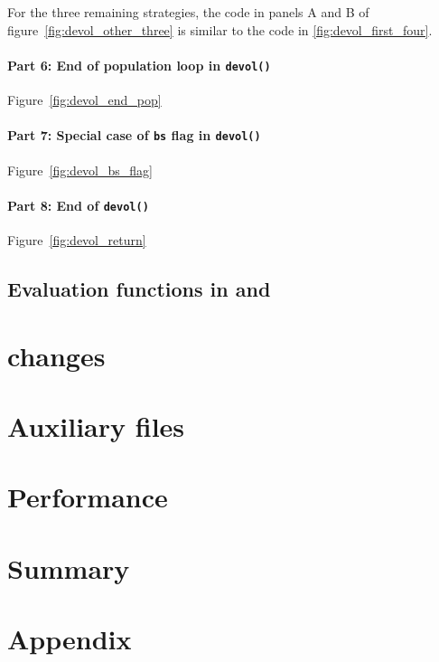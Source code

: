 \documentclass[nojss,shortnames,article]{jss}
\begin{document}
For the three remaining strategies, the code in panels A and B of
figure~\ref{fig:devol_other_three} is similar to the code in
\ref{fig:devol_first_four}.

\paragraph{Part 6: End of population loop in  \texttt{devol()}} 

Figure~\ref{fig:devol_end_pop}

\paragraph{Part 7: Special case of \texttt{bs} flag in  \texttt{devol()}} 

Figure~\ref{fig:devol_bs_flag}

\paragraph{Part 8: End  of  \texttt{devol()}} 

Figure~\ref{fig:devol_return}

\subsection[Evaluation functions in R and C++]{Evaluation functions in  and }

\section[R changes]{ changes}
\label{sec:Rchanges}

\section{Auxiliary files}

\section{Performance}

\section{Summary}




\section*{Appendix}
\end{document}
